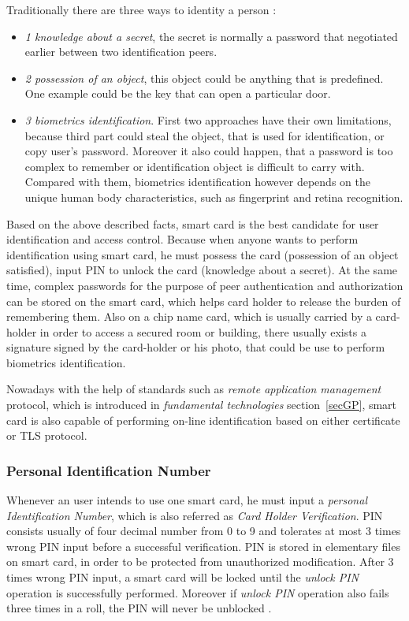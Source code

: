 Traditionally there are three ways to identity a person \cite{handbuch}:
\begin{itemize}
\item \emph{1 knowledge about a secret}, the secret is normally a password that negotiated earlier between two identification peers.
\item \emph{2 possession of an object}, this object could be anything that is predefined. One example could be the key that can open a particular door.
\item \emph{3 biometrics identification}. First two approaches have their own limitations, because third part could steal the object, that is used for identification, or copy user's password. Moreover it also could happen, that a password is too complex to remember or identification object is difficult to carry with. Compared with them, biometrics identification  however depends on the unique human body characteristics, such as fingerprint and retina recognition.
\end{itemize}
Based on the above described facts, smart card is the best candidate for user identification and access control. Because when anyone wants to perform identification using smart card, he must possess the card (possession of an object satisfied), input PIN to unlock the card (knowledge about a secret). At the same time, complex passwords for the purpose of peer authentication and authorization can be stored on the smart card, which helps card holder to release the burden of remembering them. Also on a chip name card, which is usually carried by a card-holder in order to access a secured room or building, there usually exists a signature signed by the card-holder or his photo, that could be use to perform biometrics identification. 

Nowadays with the help of standards such as \emph{remote application management} protocol, which is introduced in \emph{fundamental technologies} section~\ref{secGP}, smart card is also capable of performing on-line identification based on either certificate or TLS protocol.

\subsubsection{Personal Identification Number}
Whenever an user intends to use one smart card, he must input a \emph{personal Identification Number}, which is also referred as \emph{Card Holder Verification}. PIN consists usually of four decimal number from 0 to 9 and tolerates at most 3 times wrong PIN input before a successful verification. PIN is stored in elementary files  \cite{smart_card_access} on smart card, in order to be protected from unauthorized modification. After 3 times wrong PIN input, a smart card will be locked until the \emph{unlock PIN} operation is successfully performed. Moreover if \emph{unlock PIN} operation also fails three times in a roll, the PIN will never be unblocked \cite{smart_card_access}.

